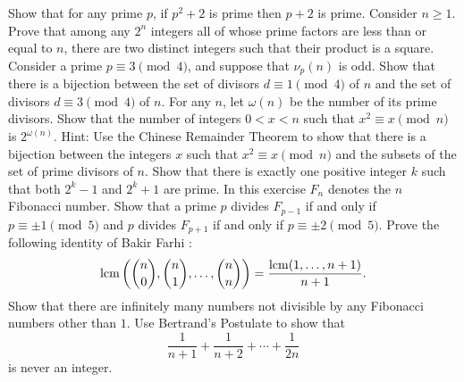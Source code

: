 \begin{challenge}
  \exercise Show that for any prime $p$, if $p^2+2$ is prime then $p+2$ is prime.
  \exercise Consider $n\geq 1$. Prove that among any $2^n$ integers all of whose prime factors are less than or equal to $n$, there are two distinct integers such that their product is a square.
  \exercise Consider a prime $p\equiv 3\pmod{4}$, and suppose that $\nu_p(n)$ is odd. Show that there is a bijection between the set of divisors $d\equiv 1\pmod{4}$ of $n$ and the set of divisors $d\equiv 3\pmod{4}$ of $n$.
  \exercise For any $n$, let $\omega(n)$ be the number of its prime divisors. Show that the number of integers $0<x<n$ such that $x^2\equiv x\pmod{n}$ is $2^{\omega(n)}$. Hint: Use the Chinese Remainder Theorem to show that there is a bijection between the integers $x$ such that $x^2\equiv x\pmod{n}$ and the subsets of the set of prime divisors of $n$.
  \exercise Show that there is exactly one positive integer $k$ such that both $2^k-1$ and $2^k+1$ are prime.
  \exercise In this exercise $F_n$ denotes the $n$\supth{} Fibonacci number. Show that a prime $p$ divides $F_{p-1}$ if and only if $p\equiv \pm 1\pmod{5}$ and $p$ divides $F_{p+1}$ if and only if $p\equiv \pm 2\pmod{5}$.  
  \exercise Prove the following identity of Bakir Farhi \cite{farhi2009}:
  \begin{equation*}
    \operatorname*{lcm}\left(\binom{n}{0},\binom{n}{1},\ldots,\binom{n}{n}\right)=
    \frac{\operatorname*{lcm}(1,\ldots,n+1)}{n+1}.
  \end{equation*}
  \exercise Show that there are infinitely many numbers not divisible by any Fibonacci numbers other than $1$.
  \exercise Use Bertrand's Postulate to show that
  \begin{equation*}
    \frac{1}{n+1}+\frac{1}{n+2}+\cdots+\frac{1}{2n}
  \end{equation*}
  is never an integer.
\end{challenge}

